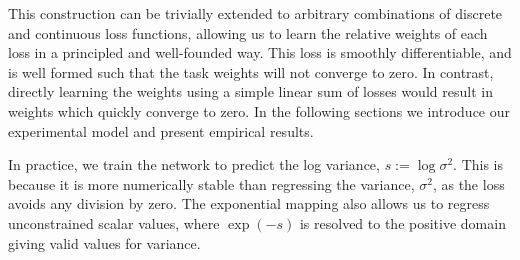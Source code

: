
This construction can be trivially extended to arbitrary combinations of discrete and continuous loss functions, allowing us to learn the relative weights of each loss in a principled and well-founded way. This loss is smoothly differentiable, and is well formed such that the task weights will not converge to zero. In contrast, directly learning the weights using a simple linear sum of losses  would result in weights which quickly converge to zero. In the following sections we introduce our experimental model and present empirical results.

In practice, we train the network to predict the log variance, $s := \log \sigma^2$.
This is because it is more numerically stable than regressing the variance, $\sigma^2$, as the loss avoids any division by zero. The exponential mapping also allows us to regress unconstrained scalar
values, where $\exp(-s)$ is resolved to the positive domain giving valid values for variance.



